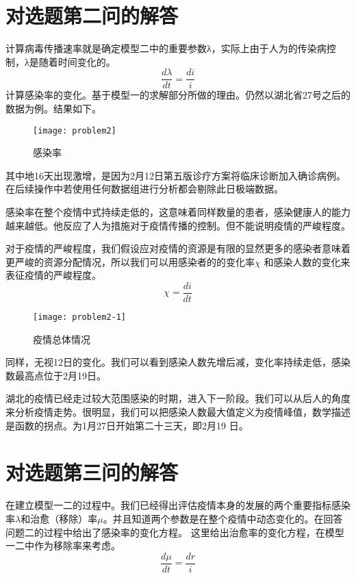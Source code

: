 \documentclass[withoutpreface,bwprint]{cumcmthesis} %
\begin{document}
\section{对选题第二问的解答}
计算病毒传播速率就是确定模型二中的重要参数λ，实际上由于人为的传染病控制，λ是随着时间变化的。
    \begin{equation}\label{qua:013}
        \frac{d\lambda}{dt}=\frac{di}{i}
    \end{equation}
计算感染率的变化。基于模型一的求解部分所做的理由。仍然以湖北省27号之后的数据为例。结果如下。
    \begin{figure}[!h]
        \centering
        \texttt{[image: problem2]}
        \caption{感染率}
        \label{fig:ana2_flow}
    \end{figure}
\par
其中地16天出现激增，是因为2月12日第五版诊疗方案将临床诊断加入确诊病例。\cite{ref5}在后续操作中若使用任何数据组进行分析都会剔除此日极端数据。
\par
感染率在整个疫情中式持续走低的，这意味着同样数量的患者，感染健康人的能力越来越低。他反应了人为措施对于疫情传播的控制。但不能说明疫情的严峻程度。
\par
对于疫情的严峻程度，我们假设应对疫情的资源是有限的显然更多的感染者意味着更严峻的资源分配情况，所以我们可以用感染者的的变化率$\chi $
和感染人数的变化来表征疫情的严峻程度。
    \begin{equation}\label{qua:014}
        \chi =\frac{di}{dt}
    \end{equation}
    \begin{figure}[!h]
        \centering
        \texttt{[image: problem2-1]}
        \caption{疫情总体情况}
        \label{fig:ana2_flow}
    \end{figure}
同样，无视12日的变化。我们可以看到感染人数先增后减，变化率持续走低，感染数最高点位于2月19日。
\par
湖北的疫情已经走过较大范围感染的时期，进入下一阶段。我们可以从后人的角度来分析疫情走势。很明显，我们可以把感染人数最大值定义为疫情峰值，数学描述是函数的拐点。为1月27日开始第二十三天，即2月19 日。
\section{对选题第三问的解答}
在建立模型一二的过程中。我们已经得出评估疫情本身的发展的两个重要指标感染率$\lambda$和治愈（移除）率$\mu$。并且知道两个参数是在整个疫情中动态变化的。在回答问题二的过程中给出了感染率的变化方程。
这里给出治愈率的变化方程，在模型一二中作为移除率来考虑。
    \begin{equation}\label{qua:013}
        \frac{d\mu}{dt}=\frac{dr}{i}
    \end{equation}
\end{document}
